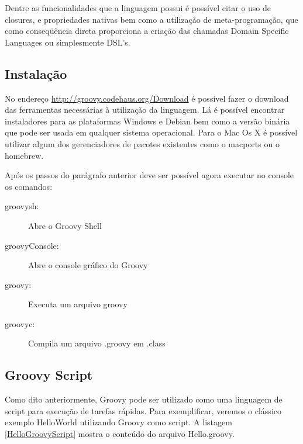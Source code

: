 \documentclass[12pt]{article}
\begin{document}
    Dentre as funcionalidades que a linguagem possui é possível citar o uso de 
    closures,  e propriedades nativas bem como a utilização de meta-programação, 
    que como conseqüência direta proporciona a criação das chamadas Domain 
    Specific Languages ou simplesmente DSL's.

\subsection{Instalação}
    
    No endereço \url{http://groovy.codehaus.org/Download} é possível fazer o 
    download das ferramentas necessárias à utilização da linguagem. Lá é possível
    encontrar instaladores para as plataformas Windows e Debian bem como a versão
    binária que pode ser usada em qualquer sistema operacional. Para o Mac Os X 
    é possível utilizar algum dos gerenciadores de pacotes existentes como o 
    macports ou o homebrew.

%    
    
    Após os passos do parágrafo anterior deve ser possível agora executar no 
    console os comandos:
    
    \begin{description}
        \item [groovysh:] Abre o Groovy Shell
        \item [groovyConsole:] Abre o console gráfico do Groovy 
        \item [groovy:] Executa um arquivo groovy
        \item [groovyc:] Compila um arquivo .groovy em .class
    \end{description}
    
\subsection{Groovy Script}
    
    Como dito anteriormente, Groovy pode ser utilizado como uma linguagem de 
    script para execução de tarefas rápidas. Para exemplificar, veremos o clássico
    exemplo HelloWorld utilizando Groovy como script. A listagem \ref{HelloGroovyScript}
    mostra o conteúdo do arquivo Hello.groovy. 
    
\end{document}
